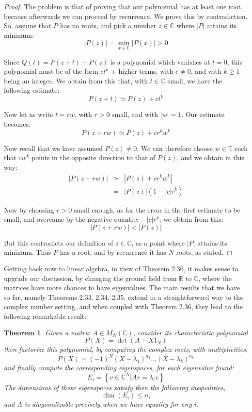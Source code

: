 \documentclass[12pt]{amsbook}
\newtheorem{theorem}{Theorem}[chapter]
\begin{document}
\begin{proof}
The problem is that of proving that our polynomial has at least one root, because afterwards we can proceed by recurrence. We prove this by contradiction. So, assume that $P$ has no roots, and pick a number $z\in\mathbb C$ where $|P|$ attains its minimum:
$$|P(z)|=\min_{x\in\mathbb C}|P(x)|>0$$ 

Since $Q(t)=P(z+t)-P(z)$ is a polynomial which vanishes at $t=0$, this polynomial must be of the form $ct^k$ + higher terms, with $c\neq0$, and with $k\geq1$ being an integer. We obtain from this that, with $t\in\mathbb C$ small, we have the following estimate:
$$P(z+t)\simeq P(z)+ct^k$$

Now let us write $t=rw$, with $r>0$ small, and with $|w|=1$. Our estimate becomes:
$$P(z+rw)\simeq P(z)+cr^kw^k$$

Now recall that we have assumed $P(z)\neq0$. We can therefore choose $w\in\mathbb T$ such that $cw^k$ points in the opposite direction to that of $P(z)$, and we obtain in this way:
\begin{eqnarray*}
|P(z+rw)|
&\simeq&|P(z)+cr^kw^k|\\
&=&|P(z)|(1-|c|r^k)
\end{eqnarray*}

Now by choosing $r>0$ small enough, as for the error in the first estimate to be small, and overcame by the negative quantity $-|c|r^k$, we obtain from this:
$$|P(z+rw)|<|P(z)|$$

But this contradicts our definition of $z\in\mathbb C$, as a point where $|P|$ attains its minimum. Thus $P$ has a root, and by recurrence it has $N$ roots, as stated.
\end{proof}

Getting back now to linear algebra, in view of Theorem 2.36, it makes sense to upgrade our discussion, by changing the ground field from $\mathbb R$ to $\mathbb C$, where the matrices have more chances to have eigenvalues. The main results that we have so far, namely Theorems 2.33, 2.34, 2.35, extend in a straightforward way to the complex number setting, and when coupled with Theorem 2.36, they lead to the following remarkable result:


\begin{theorem}
Given a matrix $A\in M_N(\mathbb C)$, consider its characteristic polynomial
$$P(X)=\det(A-X1_N)$$ 
then factorize this polynomial, by computing the complex roots, with multiplicities,
$$P(X)=(-1)^N(X-\lambda_1)^{n_1}\ldots(X-\lambda_k)^{n_k}$$
and finally compute the corresponding eigenspaces, for each eigenvalue found:
$$E_i=\left\{v\in\mathbb C^N\Big|Av=\lambda_iv\right\}$$
The dimensions of these eigenspaces satisfy then the following inequalities,
$$\dim(E_i)\leq n_i$$
and $A$ is diagonalizable precisely when we have equality for any $i$.
\end{theorem}
\end{document}

